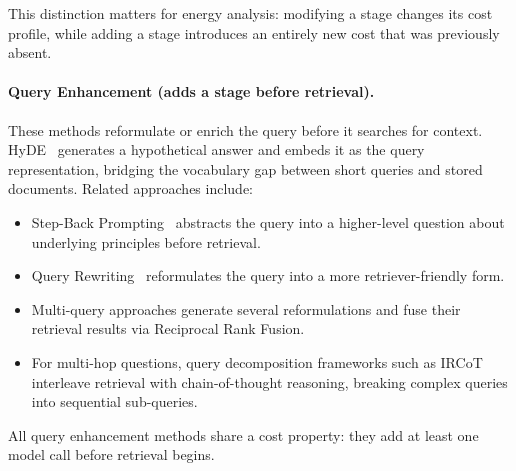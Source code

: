 This distinction matters for energy analysis: modifying a stage changes its cost profile, 
while adding a stage 
introduces an entirely new cost that was previously absent.

\paragraph{Query Enhancement (adds a stage before retrieval).}
These methods reformulate or enrich the query before it searches for context. 
HyDE~\cite{hyde2023} generates a hypothetical answer and embeds it 
as the query representation, bridging 
the vocabulary gap between short queries and stored documents. 
Related approaches include: 

\begin{itemize}
    \item Step-Back Prompting~\cite{stepback2023} abstracts the query into a 
    higher-level question about underlying principles before retrieval. 
    \item Query Rewriting~\cite{queryrewriting2023} reformulates the query 
    into a more retriever-friendly form.
    \item Multi-query approaches generate several reformulations and 
    fuse their retrieval results via Reciprocal Rank Fusion.
    \item For multi-hop questions, query decomposition frameworks such as 
    IRCoT~\cite{ircot2022} interleave retrieval with chain-of-thought
    reasoning, breaking complex queries into sequential sub-queries.
\end{itemize}

All query enhancement methods share a cost property: they add at least 
one model call before retrieval begins.


